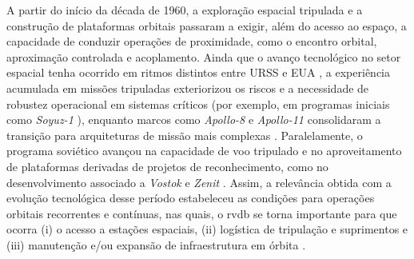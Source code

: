 A partir do início da década de 1960, a exploração espacial tripulada e a construção de plataformas orbitais passaram a exigir, além do acesso ao espaço, a capacidade de conduzir operações de proximidade, como o encontro orbital, aproximação controlada e acoplamento.
Ainda que o avanço tecnológico no setor espacial tenha ocorrido em ritmos distintos entre URSS e EUA \cite{betzler2024}, a experiência acumulada em missões tripuladas exteriorizou os riscos e a necessidade de robustez operacional em sistemas críticos (por exemplo, em programas iniciais como \emph{Soyuz-1} \cite{zak2018}), enquanto marcos como \emph{Apollo-8} e \emph{Apollo-11} consolidaram a transição para arquiteturas de missão mais complexas \cite{nasaApollo8,nasaApollo11}.
Paralelamente, o programa soviético avançou na capacidade de voo tripulado e no aproveitamento de plataformas derivadas de projetos de reconhecimento, como no desenvolvimento associado a \emph{Vostok} e \emph{Zenit} \cite{nasaVostok1,astronautixZenit}.
Assim, a relevância obtida com a evolução tecnológica desse período estabeleceu as condições para operações orbitais recorrentes e contínuas, nas quais, o \gls{rvdb} se torna importante para que ocorra
(i) o acesso a estações espaciais,
(ii) logística de tripulação e suprimentos e
(iii) manutenção e/ou expansão de infraestrutura em órbita \cite{betzler2024}.